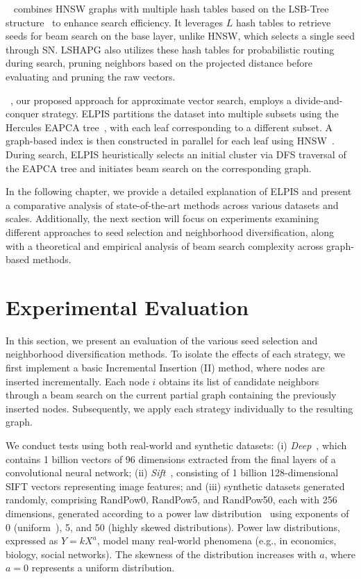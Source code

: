 ~\cite{lshapg} combines HNSW graphs with multiple hash tables based on the LSB-Tree structure~\cite{lsb} to enhance search efficiency. It leverages $L$ hash tables to retrieve seeds for beam search on the base layer, unlike HNSW, which selects a single seed through SN. LSHAPG also utilizes these hash tables for probabilistic routing during search, pruning neighbors based on the projected distance %
before evaluating and pruning the raw vectors.


~\cite{elpis}, our proposed approach for approximate vector search, employs a divide-and-conquer strategy. ELPIS partitions the dataset into multiple subsets using the Hercules EAPCA tree~\cite{hercules}, with each leaf corresponding to a different subset. A graph-based index is then constructed in parallel for each leaf using HNSW~\cite{hnsw}. During search, ELPIS heuristically selects an initial cluster via DFS traversal of the EAPCA tree and initiates beam search on the corresponding graph.

In the following chapter, we provide a detailed explanation of ELPIS and present a comparative analysis of state-of-the-art methods across various datasets and scales. Additionally, the next section will focus on experiments examining different approaches to seed selection and neighborhood diversification, along with a theoretical and empirical analysis of beam search complexity across graph-based methods.

\section{Experimental Evaluation}
\label{sec:experiments_ND_SS}

In this section, we present an evaluation of the various seed selection and neighborhood diversification methods. To isolate the effects of each strategy, we first implement a basic Incremental Insertion (II) method, where nodes are inserted incrementally. Each node \(i\) obtains its list of candidate neighbors through a beam search on the current partial graph containing the previously inserted nodes. Subsequently, we apply each strategy individually to the resulting graph.

We conduct tests using both real-world and synthetic datasets: (i) \emph{Deep}~\cite{url/data/deep1b}, which contains 1 billion vectors of 96 dimensions extracted from the final layers of a convolutional neural network; (ii) \emph{Sift}~\cite{conf/icassp/jegou2011,url/data/sift}, consisting of 1 billion 128-dimensional SIFT vectors representing image features; and (iii) synthetic datasets generated randomly, comprising RandPow0, RandPow5, and RandPow50, each with 256 dimensions, generated according to a power law distribution~\cite{powerlaw} using exponents of 0 (uniform~\cite{url/power-law}), 5, and 50 (highly skewed distributions). Power law distributions, expressed as \(Y = kX^a\), model many real-world phenomena (e.g., in economics, biology, social networks). The skewness of the distribution increases with \(a\), where \(a = 0\) represents a uniform distribution.

